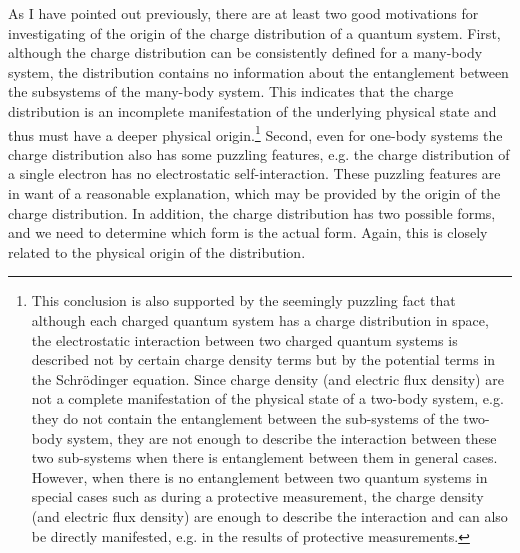 As I have pointed out previously, there are at least two good motivations for investigating of the origin of the charge distribution of a quantum system. First, although the charge distribution can be consistently defined for a many-body system, the distribution contains no information about the entanglement between the subsystems of the many-body system. This indicates that the charge distribution is an incomplete manifestation of the underlying physical state and thus must have a deeper physical origin.\footnote{This conclusion is also supported by the seemingly puzzling fact that although each charged quantum system has a charge distribution in space, the electrostatic interaction between two charged quantum systems is described not by certain charge density terms but by the potential terms in the Schr\"{o}dinger equation. Since charge density (and electric flux density) are not a complete manifestation of the physical state of a two-body system, e.g. they do not contain the entanglement between the sub-systems of the two-body system, they are not enough to describe the interaction between these two sub-systems when there is entanglement between them in general cases. However, when there is no entanglement between two quantum systems in special cases such as during a protective measurement, the charge density (and electric flux density) are enough to describe the interaction and can also be directly manifested, e.g. in the results of protective measurements.}
Second, even for one-body systems the charge distribution also has some puzzling features, e.g. the charge distribution of a single electron has no electrostatic self-interaction. These puzzling features are in want of a reasonable explanation, which may be provided by the origin of the charge distribution. In addition, the charge distribution has two possible forms, and we need to determine which form is the actual form. Again, this is closely related to the physical origin of the distribution.

